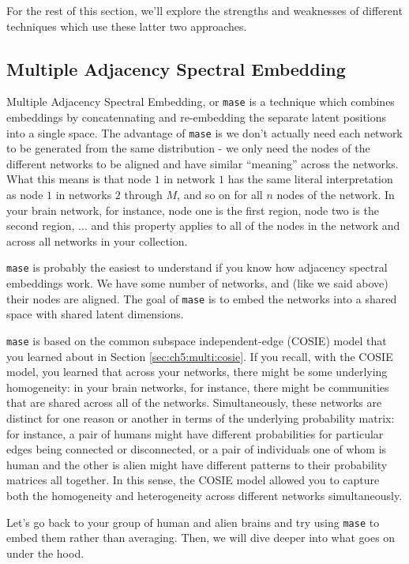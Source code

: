 For the rest of this section, we'll explore the strengths and weaknesses of different techniques which use these latter two approaches. 


\subsection{Multiple Adjacency Spectral Embedding}

Multiple Adjacency Spectral Embedding, or \texttt{mase} is a technique which combines embeddings by concatennating and re-embedding the separate latent positions into a single space. The advantage of \texttt{mase} is we don't actually need each network to be generated from the same distribution - we only need the nodes of the different networks to be aligned and have similar ``meaning'' across the networks. What this means is that node $1$ in network $1$ has the same literal interpretation as node $1$ in networks $2$ through $M$, and so on for all $n$ nodes of the network. In your brain network, for instance, node one is the first region, node two is the second region, ... and this property applies to all of the nodes in the network and across all networks in your collection.

\texttt{mase} is probably the easiest to understand if you know how adjacency spectral embeddings work. We have some number of networks, and (like we said above) their nodes are aligned. The goal of \texttt{mase} is to embed the networks into a shared space with shared latent dimensions. 

\texttt{mase} is based on the common subspace independent-edge (COSIE) model that you learned about in Section \ref{sec:ch5:multi:cosie}. If you recall, with the COSIE model, you learned that across your networks, there might be some underlying homogeneity: in your brain networks, for instance, there might be communities that are shared across all of the networks. Simultaneously, these networks are distinct for one reason or another in terms of the underlying probability matrix: for instance, a pair of humans might have different probabilities for particular edges being connected or disconnected, or a pair of individuals one of whom is human and the other is alien might have different patterns to their probability matrices all together. In this sense, the COSIE model allowed you to capture both the homogeneity and heterogeneity across different networks simultaneously.

Let's go back to your group of human and alien brains and try using \texttt{mase} to embed them rather than averaging. Then, we will dive deeper into what goes on under the hood. 

